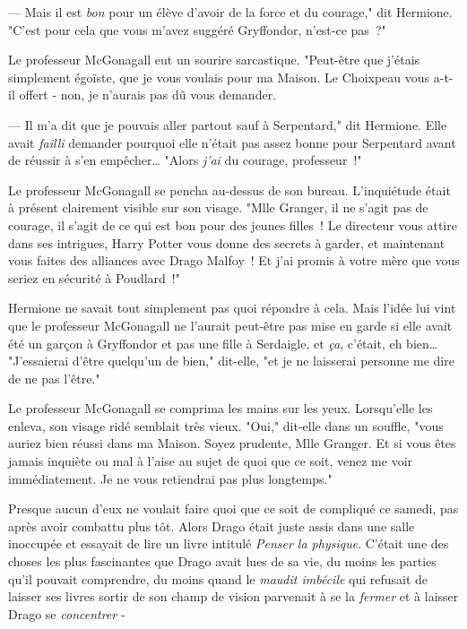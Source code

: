 --- Mais il est \emph{bon} pour un élève d'avoir de la force et du courage," dit Hermione. "C'est pour cela que vous m'avez suggéré Gryffondor, n'est-ce pas~?"

Le professeur McGonagall eut un sourire sarcastique. "Peut-être que j'étais simplement égoïste, que je vous voulais pour ma Maison. Le Choixpeau vous a-t-il offert - non, je n'aurais pas dû vous demander.

--- Il m'a dit que je pouvais aller partout sauf à Serpentard," dit Hermione. Elle avait \emph{failli} demander pourquoi elle n'était pas assez bonne pour Serpentard avant de réussir à s'en empêcher… "Alors \emph{j'ai} du courage, professeur~!"

Le professeur McGonagall se pencha au-dessus de son bureau. L'inquiétude était à présent clairement visible sur son visage. "Mlle Granger, il ne s'agit pas de courage, il s'agit de ce qui est bon pour des jeunes filles~! Le directeur vous attire dans ses intrigues, Harry Potter vous donne des secrets à garder, et maintenant vous faites des alliances avec Drago Malfoy~! Et j'ai promis à votre mère que vous seriez en sécurité à Poudlard~!"

Hermione ne savait tout simplement pas quoi répondre à cela. Mais l'idée lui vint que le professeur McGonagall ne l'aurait peut-être pas mise en garde si elle avait été un garçon à Gryffondor et pas une fille à Serdaigle, et \emph{ça}, c'était, eh bien… "J'essaierai d'être quelqu'un de bien," dit-elle, "et je ne laisserai personne me dire de ne pas l'être."

Le professeur McGonagall se comprima les mains sur les yeux. Lorsqu'elle les enleva, son visage ridé semblait très vieux. "Oui," dit-elle dans un souffle, "vous auriez bien réussi dans ma Maison. Soyez prudente, Mlle Granger. Et si vous êtes jamais inquiète ou mal à l'aise au sujet de quoi que ce soit, venez me voir immédiatement. Je ne vous retiendrai pas plus longtemps."

Presque aucun d'eux ne voulait faire quoi que ce soit de compliqué ce samedi, pas après avoir combattu plus tôt. Alors Drago était juste assis dans une salle inoccupée et essayait de lire un livre intitulé \emph{Penser la physique}. C'était une des choses les plus fascinantes que Drago avait lues de sa vie, du moins les parties qu'il pouvait comprendre, du moins quand le \emph{maudit imbécile} qui refusait de laisser ses livres sortir de son champ de vision parvenait à se la \emph{fermer} et à laisser Drago se \emph{concentrer} -

